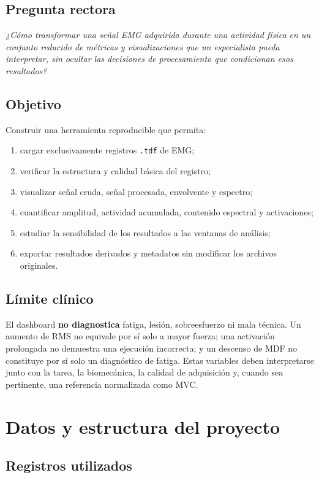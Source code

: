 \documentclass[11pt,spanish]{article}
\begin{document}
\subsection*{Pregunta rectora}
\textit{¿Cómo transformar una señal EMG adquirida durante una actividad física en un conjunto reducido de métricas y visualizaciones que un especialista pueda interpretar, sin ocultar las decisiones de procesamiento que condicionan esos resultados?}

\subsection*{Objetivo}
Construir una herramienta reproducible que permita:
\begin{enumerate}
    \item cargar exclusivamente registros \texttt{.tdf} de EMG;
    \item verificar la estructura y calidad básica del registro;
    \item visualizar señal cruda, señal procesada, envolvente y espectro;
    \item cuantificar amplitud, actividad acumulada, contenido espectral y activaciones;
    \item estudiar la sensibilidad de los resultados a las ventanas de análisis;
    \item exportar resultados derivados y metadatos sin modificar los archivos originales.
\end{enumerate}

\subsection*{Límite clínico}
El dashboard \textbf{no diagnostica} fatiga, lesión, sobreesfuerzo ni mala técnica. Un aumento de RMS no equivale por sí solo a mayor fuerza; una activación prolongada no demuestra una ejecución incorrecta; y un descenso de MDF no constituye por sí solo un diagnóstico de fatiga. Estas variables deben interpretarse junto con la tarea, la biomecánica, la calidad de adquisición y, cuando sea pertinente, una referencia normalizada como MVC.

\section{Datos y estructura del proyecto}

\subsection{Registros utilizados}
\end{document}

